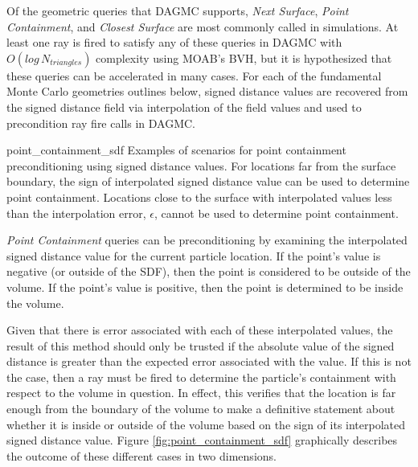 Of the geometric queries that DAGMC supports, \textit{Next Surface},
\textit{Point Containment}, and \textit{Closest Surface} are most commonly
called in simulations.  At least one ray is fired to satisfy any of these
queries in DAGMC with $O(log \, N_{triangles})$ complexity using MOAB's BVH, but it is
hypothesized that these queries can be accelerated in many cases. For each of
the fundamental Monte Carlo geometries outlines below, signed distance values
are recovered from the signed distance field via interpolation of the field
values and used to precondition ray fire calls in DAGMC.


              {point_containment_sdf}
              {Examples of scenarios for point containment preconditioning using
                signed distance values. For locations far from the surface
                boundary, the sign of interpolated signed distance value can be
                used to determine point containment. Locations close to the
                surface with interpolated values less than the interpolation
                error, $\epsilon$, cannot be used to determine point
                containment. }
              {
                \textit{Point Containment} queries can be preconditioning by examining
                the interpolated signed distance value for the current particle
                location. If the point's value is negative (or outside of the
                SDF), then the point is considered to be outside of the
                volume. If the point's value is positive, then the point is
                determined to be inside the volume.

                Given that there is error associated with each of these
                interpolated values, the result of this method should only be
                trusted if the absolute value of the signed distance is greater
                than the expected error associated with the value. If
                this is not the case, then a ray must be fired to determine the
                particle's containment with respect to the volume in
                question. In effect, this verifies that the location is far
                enough from the boundary of the volume to make a definitive
                statement about whether it is inside or outside of the volume
                based on the sign of its interpolated signed distance value.
                Figure \ref{fig:point_containment_sdf} graphically describes the
                outcome of these different cases in two dimensions.
              }

